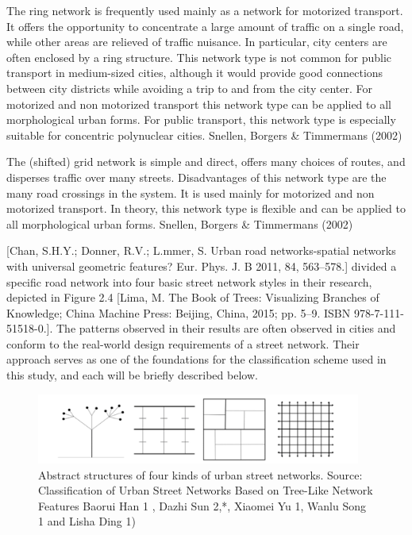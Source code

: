 The ring network is frequently used mainly as a network for motorized transport. It offers the opportunity to concentrate a large amount of traffic on a single road, while other areas are relieved of traffic nuisance. In particular, city centers are often enclosed by a ring structure. This network type is not common for public transport in medium-sized cities, although it would provide good connections between city districts while avoiding a trip to and from the city center. For motorized and non motorized transport this network type can be applied to all morphological urban forms. For public transport, this network type is especially suitable for concentric polynuclear cities. Snellen, Borgers \& Timmermans (2002)

The (shifted) grid network is simple and direct, offers many choices of routes, and disperses traffic over many streets. Disadvantages of this network type are the many road crossings in the system. It is used mainly for motorized and non motorized transport. In theory, this network type is flexible and can be applied to all morphological urban forms. Snellen, Borgers \& Timmermans (2002)

[Chan, S.H.Y.; Donner, R.V.; L.mmer, S. Urban road networks-spatial networks with universal geometric features? Eur. Phys. J. B 2011, 84, 563–578.] divided a specific road network into four basic street network styles in their research, depicted in Figure 2.4 [Lima, M. The Book of Trees: Visualizing Branches of Knowledge; China Machine Press: Beijing, China, 2015; pp. 5–9. ISBN 978-7-111-51518-0.].  The patterns observed in their results are often observed in cities and conform to the real-world design requirements of a street network. Their approach serves as one of the foundations for the classification scheme used in this study, and each will be briefly described below.

\begin{figure}[h]
\centering
\includegraphics[width=0.95\textwidth,center]{picture/figure4.png}
\caption[Abstract Structures of Four Kinds of Urban Street Networks]{Abstract structures of four kinds of urban street networks. Source: Classification of Urban Street Networks Based on Tree-Like Network Features Baorui Han 1 , Dazhi Sun 2,*, Xiaomei Yu 1, Wanlu Song 1 and Lisha Ding 1)}
\label{fig:transportnetworks}
\end{figure}

